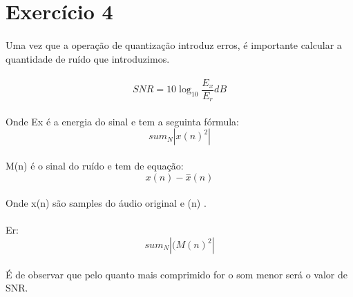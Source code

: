 \documentclass{report}
\begin{document}
\section{Exercício 4}
\paragraph{}
Uma vez que a operação de quantização introduz erros, é importante calcular a quantidade de ruído que introduzimos.
\paragraph{} 
\begin{equation}
SNR = 10 \log_{10} \frac{E_x}{E_r}  dB
\end{equation}
\paragraph{}

Onde Ex é a energia do sinal e tem a seguinta fórmula: 
\begin{equation}
sum_ {N}|x(n)^2| 
\end{equation}
\paragraph{}
M(n) é o sinal do ruído e tem de equação: 
\begin{equation}
x(n)-\overset{-}{x}(n)
\end{equation}
 \paragraph{} 
Onde x(n) são samples do áudio original e (n) . \paragraph{}

Er:  
\begin{equation}
sum_{N}|(M(n)^2|
\end{equation}

\paragraph{}
É de observar que pelo quanto mais comprimido for o som menor será o valor de SNR.
\end{document}
